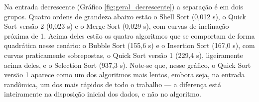 \qquad Na entrada decrescente (Gráfico \ref{fig:geral_decrescente}) a
separação é em dois grupos. Quatro ordens de grandeza abaixo estão o
Shell Sort (0,012 s), o Quick Sort versão 2 (0,023 s) e o Merge Sort
(0,029 s), com curvas de inclinação próxima de 1. Acima deles estão os
quatro algoritmos que se comportam de forma quadrática nesse cenário:
o Bubble Sort (155,6 s) e o Insertion Sort (167,0 s), com curvas
praticamente sobrepostas, o Quick Sort versão 1 (229,4 s), ligeiramente
acima deles, e o Selection Sort (937,3 s). Note-se que, nesse
gráfico, o Quick Sort versão 1 aparece como um dos algoritmos mais
lentos, embora seja, na entrada randômica, um dos mais rápidos de todo
o trabalho --- a diferença está inteiramente na disposição inicial dos
dados, e não no algoritmo.
